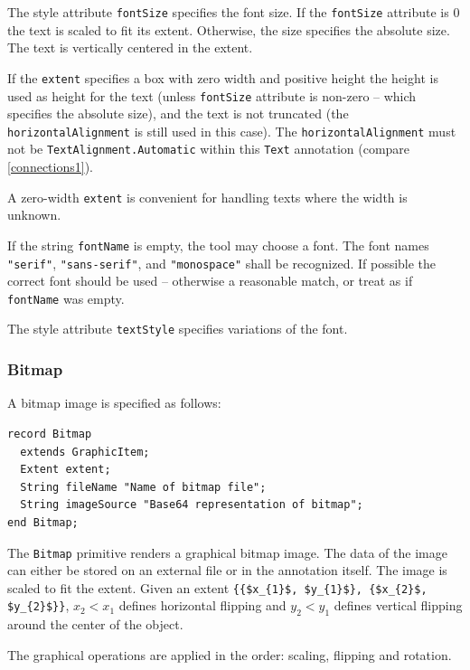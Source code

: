 The style attribute \lstinline!fontSize! specifies the font size.
If the \lstinline!fontSize! attribute is 0 the text is scaled to fit its extent.
Otherwise, the size specifies the absolute size.
The text is vertically centered in the extent.

If the \lstinline!extent! specifies a box with zero width and positive height the height is used as height for the text (unless \lstinline!fontSize! attribute is non-zero -- which specifies the absolute size), and the text is not truncated (the \lstinline!horizontalAlignment! is still used in this case).
The \lstinline!horizontalAlignment! must not be \lstinline!TextAlignment.Automatic! within this \lstinline!Text! annotation (compare \cref{connections1}).

\begin{nonnormative}
A zero-width \lstinline!extent! is convenient for handling texts where the width is unknown.
\end{nonnormative}

If the string \lstinline!fontName! is empty, the tool may choose a font.
The font names \lstinline!"serif"!, \lstinline!"sans-serif"!, and \lstinline!"monospace"! shall be recognized.
If possible the correct font should be used -- otherwise a reasonable match, or treat as if \lstinline!fontName! was empty.

The style attribute \lstinline!textStyle! specifies variations of the font.

\subsubsection{Bitmap}\label{bitmap}

A bitmap image is specified as follows:
\begin{lstlisting}[language=modelica]
record Bitmap
  extends GraphicItem;
  Extent extent;
  String fileName "Name of bitmap file";
  String imageSource "Base64 representation of bitmap";
end Bitmap;
\end{lstlisting}%
The \lstinline!Bitmap! primitive renders a graphical bitmap image.
The data of the image can either be stored on an external file or in the annotation itself.
The image is scaled to fit the extent.
Given an extent \lstinline!{{$x_{1}$, $y_{1}$}, {$x_{2}$, $y_{2}$}}!, $x_{2} < x_{1}$ defines horizontal flipping and $y_{2} < y_{1}$ defines vertical flipping around the center of the object.

The graphical operations are applied in the order: scaling, flipping and rotation.

